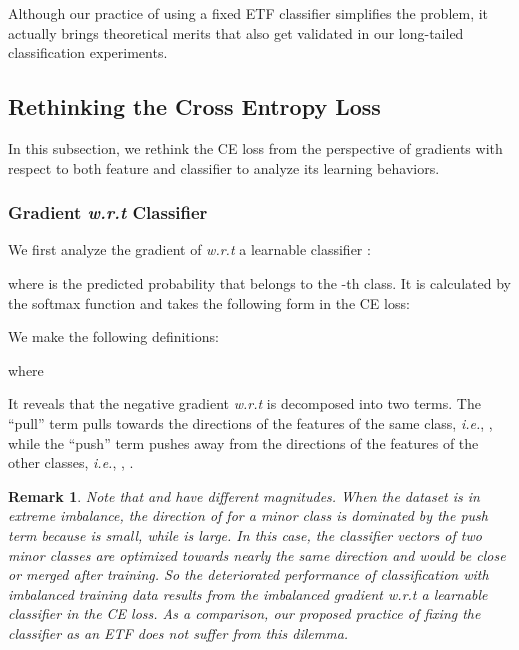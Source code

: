 \documentclass{article}
\newtheorem{remark}{Remark}
\newcommand{\<}{\left\langle}
\renewcommand{\>}{\right\rangle}
\begin{document}
Although our practice of using a fixed ETF classifier simplifies the problem, it actually brings theoretical merits that also get validated in our long-tailed classification experiments. 



\subsection{Rethinking the Cross Entropy Loss}
\vspace{-1mm}


In this subsection, we rethink the CE loss  from the perspective of gradients with respect to both feature and classifier to analyze its learning behaviors. 

\vspace{-0.5mm}
\subsubsection{Gradient \emph{w.r.t} Classifier}
\vspace{-0.5mm}

We first analyze the gradient of  \emph{w.r.t} a learnable classifier :

where  is the predicted probability that  belongs to the -th class. It is calculated by the softmax function and takes the following form in the CE loss:

We make the following definitions:

where 




\iffalse

\fi
It reveals that the negative gradient \emph{w.r.t}   is decomposed into two terms. The ``pull'' term  pulls  towards the directions of the features of the same class, \emph{i.e.}, , while the ``push'' term  pushes  away from the directions of the features of the other classes, \emph{i.e.}, , . 

\begin{remark}
	\label{remark2}
Note that  and  have different magnitudes. When the dataset is in extreme imbalance, the direction of  for a minor class is dominated by the push term  because  is small, while  is large. In this case, the classifier vectors of two minor classes are optimized towards nearly the same direction and would be close or merged after training. {So the deteriorated performance of classification with imbalanced training data results from the imbalanced gradient \emph{w.r.t} a learnable classifier in the CE loss. As a comparison, our proposed practice of fixing the classifier as an ETF does not suffer from this dilemma. }
\end{remark}
\end{document}
